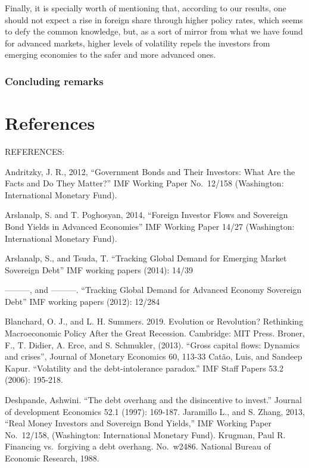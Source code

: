 \documentclass[
]{article}
\begin{document}
Finally, it is specially worth of mentioning that, according to our
results, one should not expect a rise in foreign share through higher
policy rates, which seems to defy the common knowledge, but, as a sort
of mirror from what we have found for advanced markets, higher levels of
volatility repels the investors from emerging economies to the safer and
more advanced ones.

\hypertarget{concluding-remarks}{%
\subsubsection{Concluding remarks}\label{concluding-remarks}}

\hypertarget{references}{%
\section{References}\label{references}}

REFERENCES:

Andritzky, J. R., 2012, ``Government Bonds and Their Investors: What Are
the Facts and Do They Matter?'' IMF Working Paper No.~12/158
(Washington: International Monetary Fund).

Arslanalp, S. and T. Poghosyan, 2014, ``Foreign Investor Flows and
Sovereign Bond Yields in Advanced Economies'' IMF Working Paper 14/27
(Washington: International Monetary Fund).

Arslanalp, S., and Tsuda, T. ``Tracking Global Demand for Emerging
Market Sovereign Debt'' IMF working papers (2014): 14/39

---------, and ---------. ``Tracking Global Demand for Advanced Economy
Sovereign Debt'' IMF working papers (2012): 12/284

Blanchard, O. J., and L. H. Summers. 2019. Evolution or Revolution?
Rethinking Macroeconomic Policy After the Great Recession. Cambridge:
MIT Press. Broner, F., T. Didier, A. Erce, and S. Schmukler, (2013).
``Gross capital flows: Dynamics and crises'', Journal of Monetary
Economics 60, 113-33 Catão, Luis, and Sandeep Kapur. ``Volatility and
the debt-intolerance paradox.'' IMF Staff Papers 53.2 (2006): 195-218.

Deshpande, Ashwini. ``The debt overhang and the disincentive to
invest.'' Journal of development Economics 52.1 (1997): 169-187.
Jaramillo L., and S. Zhang, 2013, ``Real Money Investors and Sovereign
Bond Yields,'' IMF Working Paper No.~12/158, (Washington: International
Monetary Fund). Krugman, Paul R. Financing vs.~forgiving a debt
overhang. No.~w2486. National Bureau of Economic Research, 1988.
\end{document}
